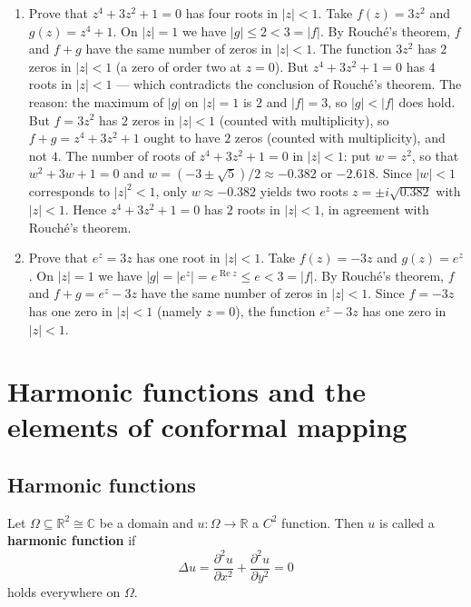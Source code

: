\begin{example}\label{ex:ca_rouche_application}
\begin{enumerate}[label=(\roman*)]
    \item Prove that $z^4 + 3z^2 + 1 = 0$ has four roots in $|z| < 1$. Take $f(z) = 3z^2$ and $g(z) = z^4 + 1$. On $|z| = 1$ we have $|g| \le 2 < 3 = |f|$. By Rouché's theorem, $f$ and $f + g$ have the same number of zeros in $|z| < 1$. The function $3z^2$ has $2$ zeros in $|z| < 1$ (a zero of order two at $z = 0$). But $z^4 + 3z^2 + 1 = 0$ has $4$ roots in $|z| < 1$ --- which contradicts the conclusion of Rouché's theorem. The reason: the maximum of $|g|$ on $|z| = 1$ is $2$ and $|f| = 3$, so $|g| < |f|$ does hold. But $f = 3z^2$ has $2$ zeros in $|z| < 1$ (counted with multiplicity), so $f + g = z^4 + 3z^2 + 1$ ought to have $2$ zeros (counted with multiplicity), and not $4$. The number of roots of $z^4 + 3z^2 + 1 = 0$ in $|z| < 1$: put $w = z^2$, so that $w^2 + 3w + 1 = 0$ and $w = (-3 \pm \sqrt{5})/2 \approx -0.382$ or $-2.618$. Since $|w| < 1$ corresponds to $|z|^2 < 1$, only $w \approx -0.382$ yields two roots $z = \pm i\sqrt{0.382}$ with $|z| < 1$. Hence $z^4 + 3z^2 + 1 = 0$ has $2$ roots in $|z| < 1$, in agreement with Rouché's theorem.
    \item Prove that $e^z = 3z$ has one root in $|z| < 1$. Take $f(z) = -3z$ and $g(z) = e^z$. On $|z| = 1$ we have $|g| = |e^z| = e^{\operatorname{Re} z} \le e < 3 = |f|$. By Rouché's theorem, $f$ and $f + g = e^z - 3z$ have the same number of zeros in $|z| < 1$. Since $f = -3z$ has one zero in $|z| < 1$ (namely $z = 0$), the function $e^z - 3z$ has one zero in $|z| < 1$.
\end{enumerate}
\end{example}

\section{Harmonic functions and the elements of conformal mapping}

\subsection{Harmonic functions}

\begin{definition}\label{def:ca_harmonic_function}
Let $\Omega \subseteq \mathbb{R}^2 \cong \mathbb{C}$ be a domain and $u: \Omega \to \mathbb{R}$ a $C^2$ function. Then $u$ is called a \textbf{harmonic function} if
\[
\Delta u = \frac{\partial^2 u}{\partial x^2} + \frac{\partial^2 u}{\partial y^2} = 0
\]
holds everywhere on $\Omega$.
\end{definition}

